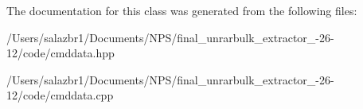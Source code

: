 The documentation for this class was generated from the following files\-:\begin{DoxyCompactItemize}
\item 
/\-Users/salazbr1/\-Documents/\-N\-P\-S/final\-\_\-unrarbulk\-\_\-extractor\-\_-\/26-\/12/code/cmddata.\-hpp\item 
/\-Users/salazbr1/\-Documents/\-N\-P\-S/final\-\_\-unrarbulk\-\_\-extractor\-\_-\/26-\/12/code/cmddata.\-cpp\end{DoxyCompactItemize}
